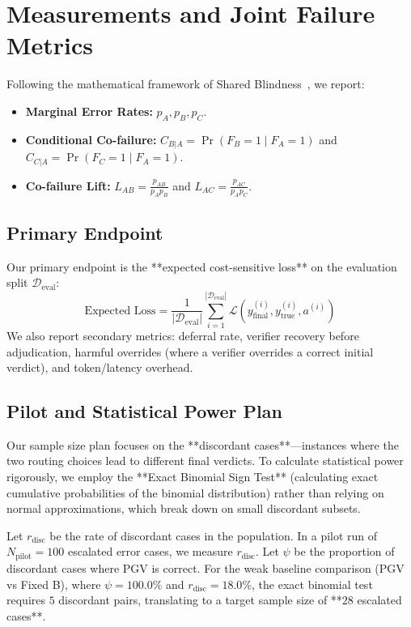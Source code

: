 \documentclass[manuscript,screen,nonacm]{acmart}
\newcommand{\PilotDisc}{18.0}
\newcommand{\PilotPsi}{100.0}
\newcommand{\PilotRequiredCases}{28}
\newcommand{\PilotDiscordantRequired}{5}
\begin{document}
\section{Measurements and Joint Failure Metrics}
\label{sec:metrics}

Following the mathematical framework of Shared Blindness~\cite{paul2026shared}, we report:
\begin{itemize}
    \item \textbf{Marginal Error Rates:} $p_A, p_B, p_C$.
    \item \textbf{Conditional Co-failure:} $C_{B|A} = \Pr(F_B=1 \mid F_A=1)$ and $C_{C|A} = \Pr(F_C=1 \mid F_A=1)$.
    \item \textbf{Co-failure Lift:} $L_{AB} = \frac{p_{AB}}{p_A p_B}$ and $L_{AC} = \frac{p_{AC}}{p_A p_C}$.
\end{itemize}

\subsection{Primary Endpoint}
Our primary endpoint is the **expected cost-sensitive loss** on the evaluation split $\mathcal{D}_{\text{eval}}$:
\begin{equation}
    \text{Expected Loss} = \frac{1}{|\mathcal{D}_{\text{eval}}|} \sum_{i=1}^{|\mathcal{D}_{\text{eval}}|} \mathcal{L}(y_{\text{final}}^{(i)}, y_{\text{true}}^{(i)}, a^{(i)})
\end{equation}
We also report secondary metrics: deferral rate, verifier recovery before adjudication, harmful overrides (where a verifier overrides a correct initial verdict), and token/latency overhead.

\subsection{Pilot and Statistical Power Plan}
Our sample size plan focuses on the **discordant cases**—instances where the two routing choices lead to different final verdicts. To calculate statistical power rigorously, we employ the **Exact Binomial Sign Test** (calculating exact cumulative probabilities of the binomial distribution) rather than relying on normal approximations, which break down on small discordant subsets.

Let $r_{\text{disc}}$ be the rate of discordant cases in the population. In a pilot run of $N_{\text{pilot}} = 100$ escalated error cases, we measure $r_{\text{disc}}$. Let $\psi$ be the proportion of discordant cases where PGV is correct. For the weak baseline comparison (PGV vs Fixed B), where $\psi = \PilotPsi\%$ and $r_{\text{disc}} = \PilotDisc\%$, the exact binomial test requires $\PilotDiscordantRequired$ discordant pairs, translating to a target sample size of **$\PilotRequiredCases$ escalated cases**.
\end{document}
